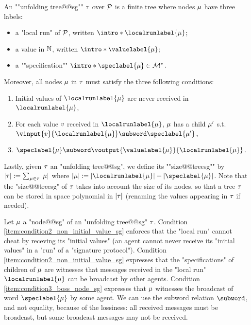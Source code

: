 \begin{definition}
\label{def:unfolding_tree_signature}
\AP An ""unfolding tree@@sg"" $\tau$ over $\mathcal{P}$ is
a finite tree where nodes $\mu$ have three labels:
\begin{itemize}
	\item a "local run" of $\mathcal{P}$, written $\intro*\localrunlabel{\node}$;
	
	\item a value in $\mathbb{N}$, written $\intro*\valuelabel{\node}$;
	
	\item a ""specification"" $\intro*\speclabel{\node} \in \messages^*$.
\end{itemize} 
Moreover, all nodes $\mu$ in $\tau$ must satisfy the three following conditions:
\begin{enumerate}[label= (\roman*), ref=(\roman*)]
	\item \label{item:condition1_initial_value_sg} Initial values of $\localrunlabel{\node}$ are never received in $\localrunlabel{\node}$,
	\item \label{item:condition2_non_initial_value_sg} For each value $v$ received in $\localrunlabel{\node}$, $\mu$ has a child $\mu'$ s.t. $\vinput{\aval}{\localrunlabel{\node}} \subword \speclabel{\node'}$,
	\item \label{item:condition3_boss_node_sg} $\speclabel{\node} \subword \voutput{\valuelabel{\node}}{\localrunlabel{\node}}$.
\end{enumerate}

\AP Lastly, given $\tau$ an "unfolding tree@@sg", we define its ""size@@treesg"" by $|\tau| := \sum_{\mu \in \tau} |\mu|$ where $\size{\node} := \size{\localrunlabel{\node}} + \size{\speclabel{\node}}$. Note that the "size@@treesg" of $\tau$ takes into account the size of its nodes, so that a tree $\tau$ can be stored in space polynomial in $|\tau|$ (renaming the values appearing in $\tau$ if needed). 
\end{definition}
Let $\mu$ a "node@@sg" of an "unfolding tree@@sg" $\tau$. Condition \ref{item:condition2_non_initial_value_sg} enforces that the "local run" cannot cheat by receving its "initial values" (an agent cannot never receive its "initial values" in a "run" of a "signature protocol"). 
Condition \ref{item:condition2_non_initial_value_sg} expresses that the "specifications" of children of $\mu$ are witnesses that messages received in the "local run" $\localrunlabel{\node}$ can be broadcast by other agents. Condition \ref{item:condition3_boss_node_sg} expresses that $\mu$ witnesses the broadcast of word $\speclabel{\node}$ by some agent. We can use the subword relation $\subword$, and not equality, because of the lossiness: all received messages must be broadcast, but some broadcast messages may not be received.  

